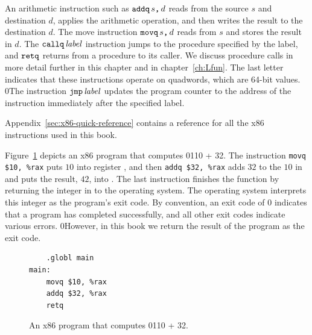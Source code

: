 \documentclass[7x10]{TimesAPriori_MIT}%
\def\racketEd{0}
\def\pythonEd{1}
\def\edition{1}
\newcommand{\racket}[1]{{\if\edition\racketEd{#1}\fi}}
\newcommand{\pythonColor}[0]{}
\newcommand{\python}[1]{{\if\edition\pythonEd\pythonColor #1\fi}}
\numberwithin{theorem}{chapter}
\numberwithin{definition}{chapter}
\numberwithin{equation}{chapter}
\begin{document}
An arithmetic instruction such as $\texttt{addq}\,s\texttt{,}\,d$ reads from
the source $s$ and destination $d$, applies the arithmetic operation,
and then writes the result to the destination $d$. 
%
The move instruction $\texttt{movq}\,s\texttt{,}\,d$ reads from $s$ and
stores the result in $d$.
%
The $\texttt{callq}\,\mathit{label}$ instruction jumps to the procedure
specified by the label, and $\texttt{retq}$ returns from a procedure to
its caller. 
%
We discuss procedure calls in more detail further in this chapter and
in chapter~\ref{ch:Lfun}.
%
The last letter  indicates that these instructions operate on
quadwords, which are 64-bit values.
%
\racket{The instruction $\texttt{jmp}\,\mathit{label}$ updates the program
  counter to the address of the instruction immediately after the
  specified label.}

Appendix~\ref{sec:x86-quick-reference} contains a reference for
all the x86 instructions used in this book.

Figure~\ref{fig:p0-x86} depicts an x86 program that computes
\racket{}\python{10 + 32}. The instruction
\lstinline{movq $10, %rax}
puts $10$ into register , and then \lstinline{addq $32, %rax}
adds $32$ to the $10$ in  and
puts the result, $42$, into .
%
The last instruction  finishes the  function by
returning the integer in  to the operating system. The
operating system interprets this integer as the program's exit
code. By convention, an exit code of 0 indicates that a program has
completed successfully, and all other exit codes indicate various
errors.
%
\racket{However, in this book we return the result of the program
  as the exit code.}

\begin{figure}[tbp]
\begin{minipage}{0.45\textwidth}
\begin{tcolorbox}[colback=white]
\begin{lstlisting}
    .globl main
main:
    movq $10, %rax
    addq $32, %rax
    retq
\end{lstlisting}
\end{tcolorbox}
\end{minipage}

\caption{An x86 program that computes
  \racket{}\python{10 + 32}.}
\label{fig:p0-x86}
\end{figure}
\end{document}
